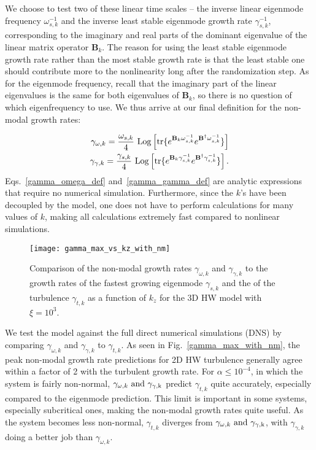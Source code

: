 \documentclass[twocolumn,showkeys,superscriptaddress]{revtex4}
\def\beqar{\begin{eqnarray}}
\def\eeqar{\end{eqnarray}}
\begin{document}
We choose to test two of these linear time scales -- the inverse linear eigenmode frequency $\omega_{s,k}^{-1}$ and the inverse least stable eigenmode growth rate $\gamma_{s,k}^{-1}$, corresponding to the imaginary and real parts
of the dominant eigenvalue of the linear matrix operator $\mathbf{B}_k$.
The reason for using the least stable eigenmode growth rate rather than the most stable growth rate is that the least stable one should contribute more to the nonlinearity long after the randomization step.
As for the eigenmode frequency, recall that the imaginary part of the linear eigenvalues is the same for both eigenvalues of $\mathbf{B}_k$, so there is no question of which eigenfrequency to use. 
We thus arrive at our final definition for the non-modal growth rates:

\beqar
\label{gamma_omega_def}
\gamma_{\omega,k} = \frac{\omega_{s,k}}{4} \ {\rm{Log}} \left[ {\rm{tr}} \{ e^{\mathbf{B}_k \omega_{s,k}^{-1}} e^{\mathbf{B}^{\dagger} \omega_{s,k}^{-1}} \} \right] \\
\label{gamma_gamma_def}
\gamma_{\gamma,k} = \frac{\gamma_{s,k}}{4} \ {\rm{Log}} \left[ {\rm{tr}} \{ e^{\mathbf{B}_k \gamma_{s,k}^{-1}} e^{\mathbf{B}^{\dagger} \gamma_{s,k}^{-1}} \} \right].
\eeqar
Eqs.~\ref{gamma_omega_def} and~\ref{gamma_gamma_def} are analytic expressions that require no numerical simulation. 
Furthermore, since the $k$'s have been decoupled by the model, one does not have to perform calculations for many values of $k$, making all calculations extremely fast compared to nonlinear simulations.

\begin{figure}
\centerline{\texttt{[image: gamma\_max\_vs\_kz\_with\_nm]}}
\caption{Comparison of the non-modal growth rates $\gamma_{\omega,k}$ and $\gamma_{\gamma,k}$ to the growth rates of the fastest growing eigenmode $\gamma_{s,k}$ 
and the of the turbulence $\gamma_{t,k}$ as a function of $k_z$ for the 3D HW model with $\xi = 10^3$.}
\label{gamma_max_vs_kz_with_nm}
\end{figure}

We test the model against the full direct numerical simulations (DNS) by comparing $\gamma_{\omega,k}$ and $\gamma_{\gamma,k}$ to $\gamma_{t,k}$. 
As seen in Fig.~\ref{gamma_max_with_nm}, the peak non-modal growth rate predictions for 2D HW turbulence generally agree within a factor of 2 with the turbulent growth rate. For $\alpha \le 10^{-4}$,
in which the system is fairly non-normal, $\gamma_{\omega,k} \ \rm{and} \ \gamma_{\gamma,k}$ predict $\gamma_{t,k}$ quite accurately, especially compared to the eigenmode prediction. 
This limit is important in some systems, especially subcritical ones, making the non-modal growth rates quite useful.
As the system becomes less non-normal, $\gamma_{t,k}$ diverges from $\gamma_{\omega,k} \ \rm{and} \ \gamma_{\gamma,k}$, with $\gamma_{\gamma,k}$ doing a better job than $\gamma_{\omega,k}$.
\end{document}
